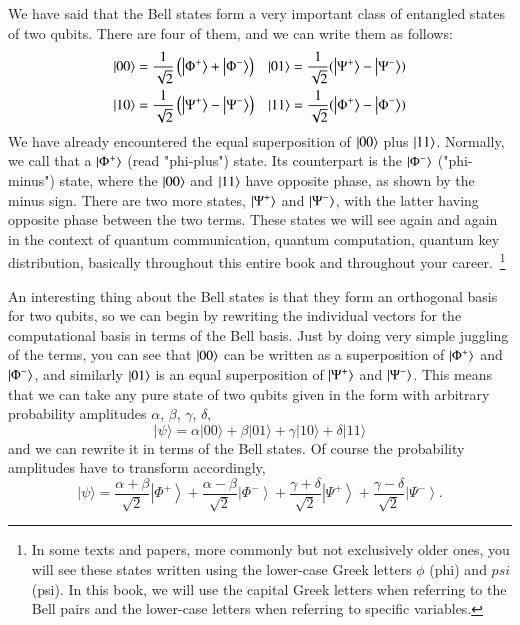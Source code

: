 
We have said that the Bell states form a very important class of entangled states of two qubits. There are four of them, and we can write them as follows: 
\begin{equation}
\begin{aligned}
|00\rangle &=\frac{1}{\sqrt{2}}\left(\left|\Phi^{+}\right\rangle+\left|\Phi^{-}\right\rangle\right) & 
\left| 01 \right\rangle = \frac{1}{\sqrt2}(\left| \Psi^{+} \right\rangle - \left| \Psi^{-} \right\rangle) \\
|10\rangle &=\frac{1}{\sqrt{2}}\left(\left|\Psi^{+}\right\rangle-\left|\Psi^{-}\right\rangle\right) & 
\left| 11 \right\rangle = \frac{1}{\sqrt2}(\left| \Phi^{+} \right\rangle - \left| \Phi^{-} \right\rangle)
\end{aligned}
\end{equation}
We have already encountered the equal superposition of $\left| 00 \right\rangle$ plus $\left| 11 \right\rangle$. Normally, we call that a $\left| \Phi^+ \right\rangle$ (read "phi-plus") state. Its counterpart is the $\left| \Phi^- \right\rangle$ ("phi-minus") state, where the $\left| 00 \right\rangle$ and $\left| 11 \right\rangle$ have opposite phase, as shown by the minus sign. There are two more states, $\left| \Psi^+ \right\rangle$ and $\left| \Psi^- \right\rangle$, with the latter having opposite phase between the two terms.  These states we will see again and again in the context of quantum communication, quantum computation, quantum key distribution, basically throughout this entire book and throughout your career.~\footnote{In some texts and papers, more commonly but not exclusively older ones, you will see these states written using the lower-case Greek letters $\phi$ (phi) and $psi$ (psi).  In this book, we will use the capital Greek letters when referring to the Bell pairs and the lower-case letters when referring to specific variables.} 

An interesting thing about the Bell states is that they form an orthogonal basis for two qubits, so we can begin by rewriting the individual vectors for the computational basis in terms of the Bell basis. Just by doing very simple juggling of the terms, you can see that $\left| 00 \right\rangle$ can be written as a superposition of $\left| \Phi^+ \right\rangle$ and $\left| \Phi^- \right\rangle$, and similarly $\left| 01 \right\rangle$ is an equal superposition of $\left| \Psi^+ \right\rangle$ and $\left| \Psi^- \right\rangle$.
This means that we can take any pure state of two qubits given in the form with arbitrary probability amplitudes $\alpha$, $\beta$, $\gamma$, $\delta$,
\begin{equation}
|\psi\rangle=\alpha|00\rangle+\beta|01\rangle+\gamma|10\rangle+\delta|11\rangle
\end{equation}
and we can rewrite it in terms of the Bell states.  Of course the probability amplitudes have to transform accordingly,
\begin{equation}
|\psi\rangle=\frac{\alpha+\beta}{\sqrt{2}}\left|\Phi^{+}\right\rangle+\frac{\alpha-\beta}{\sqrt{2}}\left|\Phi^{-}\right\rangle+\frac{\gamma+\delta}{\sqrt{2}}\left|\Psi^{+}\right\rangle+\frac{\gamma-\delta}{\sqrt{2}}\left|\Psi^{-}\right\rangle.
\end{equation}

